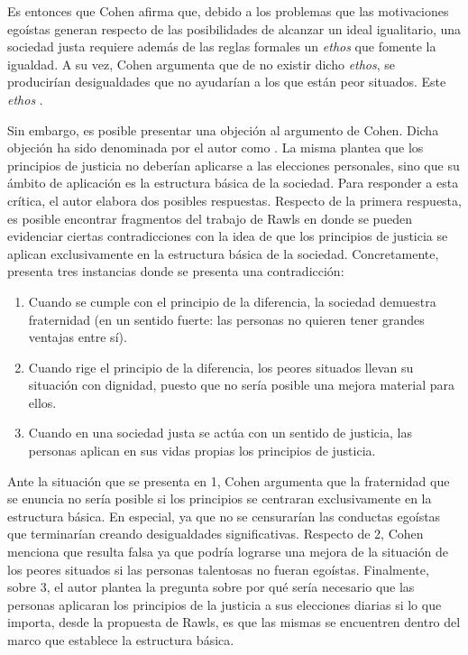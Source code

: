Es entonces que Cohen afirma que, debido a los problemas que las motivaciones egoístas generan respecto de las posibilidades de alcanzar un ideal igualitario, una sociedad justa requiere además de las reglas formales un \textit{ethos} que fomente la igualdad. A su vez, Cohen argumenta que de no existir dicho \textit{ethos}, se producirían desigualdades que no ayudarían a los que están peor situados. Este \textit{ethos}  \citep[p. 174]{Cohen_2001}.



Sin embargo, es posible presentar una objeción al argumento de Cohen. Dicha objeción ha sido denominada por el autor como . La misma plantea que los principios de justicia no deberían aplicarse a las elecciones personales, sino que su ámbito de aplicación es la estructura básica de la sociedad. Para responder a esta crítica, el autor elabora dos posibles respuestas. Respecto de la primera respuesta, es posible encontrar fragmentos del trabajo de Rawls en donde se pueden evidenciar ciertas contradicciones con la idea de que los principios de justicia se aplican exclusivamente en la estructura básica de la sociedad. Concretamente, \citet{Cohen_2001} presenta tres instancias donde se presenta una contradicción: 

\vspace{3mm}
\begin{enumerate}
    \item Cuando se cumple con el principio de la diferencia, la sociedad demuestra fraternidad (en un sentido fuerte: las personas no quieren tener grandes ventajas entre sí).
    \item Cuando rige el principio de la diferencia, los peores situados llevan su situación con dignidad, puesto que no sería posible una mejora material para ellos.
    \item Cuando en una sociedad justa se actúa con un sentido de justicia, las personas aplican en sus vidas propias los principios de justicia.
\end{enumerate}
\vspace{3mm}

Ante la situación que se presenta en 1, Cohen argumenta que la fraternidad que se enuncia no sería posible si los principios se centraran exclusivamente en la estructura básica. En especial, ya que no se censurarían las conductas egoístas que terminarían creando desigualdades significativas. Respecto de 2, Cohen menciona que resulta falsa ya que podría lograrse una mejora de la situación de los peores situados si las personas talentosas no fueran egoístas. Finalmente, sobre 3, el autor plantea la pregunta sobre por qué sería necesario que las personas aplicaran los principios de la justicia a sus elecciones diarias si lo que importa, desde la propuesta de Rawls, es que las mismas se encuentren dentro del marco que establece la estructura básica.

